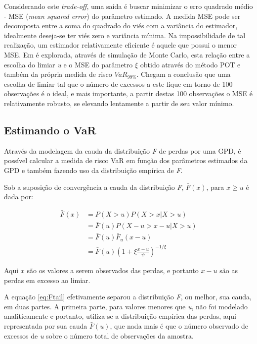 \documentclass[review]{elsarticle}
\theoremstyle{definition}
\begin{document}
Considerando este \emph{trade-off}, uma saída é buscar minimizar o erro quadrado médio - MSE (\emph{mean squared error}) do parâmetro estimado. A medida MSE pode ser decomposta entre a soma do quadrado do viés com a variância do estimador, idealmente deseja-se ter viés zero e variância mínima. Na impossibilidade de tal realização, um estimador relativamente eficiente é aquele que possui o menor MSE. Em \cite[seção 5.2.5, p. ~139]{McNeil2015} é explorada, através de simulação de Monte Carlo, esta relação entre a escolha do limiar \emph{u} e o MSE do parâmetro $\xi$ obtido através do método POT e também da própria medida de risco $VaR_{99\%}$. Chegam a conclusão que uma escolha de limiar tal que o número de excessos a este fique em torno de 100 observações é o ideal, e mais importante, a partir destas 100 observações o MSE é relativamente robusto, se elevando lentamente a partir de seu valor mínimo.

\subsection{Estimando o VaR}
\label{sec:var}

Através da modelagem da cauda da distribuição \emph{F} de perdas por uma GPD, é possível calcular a medida de risco VaR em função dos parâmetros estimados da GPD e também fazendo uso da distribuição empírica de \emph{F}.

Sob a suposição de convergência a cauda da distribuição \emph{F}, $\bar{F}(x)$, para $x \geq u$ é dada por:

\begin{align}
\label{eq:Ftail}
\bar{F}(x) & = P(X>u)P(X>x|X>u) \nonumber \\
& = \bar{F}(u) P(X-u>x-u|X>u) \nonumber \\
& = \bar{F}(u)\bar{F}_u(x-u) \nonumber \\
& = \bar{F}(u)\left(1+\xi \frac{x-u}{\psi}\right)^{-1/\xi}
\end{align}

Aqui $x$ são os valores a serem observados das perdas, e portanto $x-u$ são as perdas em excesso ao limiar.

A equação \eqref{eq:Ftail} efetivamente separou a distribuição \emph{F}, ou melhor, sua cauda, em duas partes. A primeira parte, para valores menores que \emph{u}, não foi modelado analiticamente e portanto, utiliza-se a distribuição empírica das perdas, aqui representada por sua cauda $\bar{F}(u)$, que nada mais é que o número observado de excessos de \emph{u} sobre o número total de observações da amostra.
\end{document}
